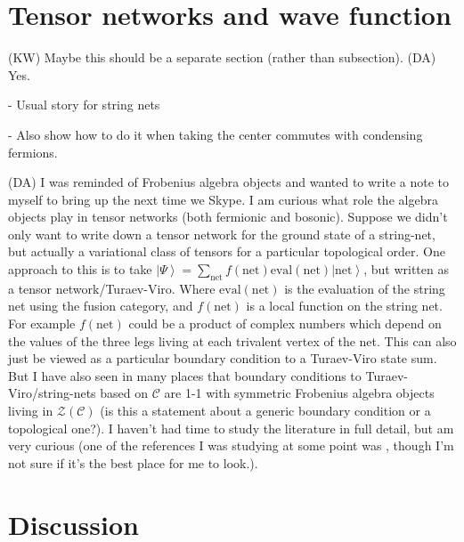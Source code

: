 \documentclass[12pt,a4paper]{article}
\newcommand{\mcz}{\mathcal{Z}}
\newcommand{\mcc}{\mathcal{C}}
\newcommand{\kw}[1]{{\color{kwcolor}\footnotesize{(KW) #1}}}
\newcommand{\ket}[1]{\ensuremath{\left|#1\right\rangle}}
\newcommand{\dave}[1]{{\color{ao(english)}\footnotesize{(DA) #1}}}
\begin{document}



\section{Tensor networks and wave function}
\kw{Maybe this should be a separate section (rather than subsection).}
\dave{Yes.}

- Usual story for string nets

- Also show how to do it when taking the center commutes with condensing fermions. 


\dave{
I was reminded of Frobenius algebra objects and wanted to write a note to myself to bring up the next time we Skype.
I am curious what role the algebra objects play in tensor networks (both fermionic and bosonic).
Suppose we didn't only want to write down a tensor network for the ground state of a string-net, 
but actually a variational class of tensors for a particular topological order.
One approach to this is to take $\ket{\Psi} = \sum_{\text{net}} f(\text{net}) \text{eval}(\text{net}) \ket{\text{net}}$, but written as a tensor network/Turaev-Viro. 
Where $\text{eval}(\text{net})$ is the evaluation of the string net using the fusion category, 
and $f(\text{net})$ is a local function on the string net.
For example $f(\text{net})$ could be a product of complex numbers which depend on the values of the three legs living at each trivalent vertex of the net. 
This can also just be viewed as a particular boundary condition to a Turaev-Viro state sum.
But I have also seen in many places that boundary conditions to Turaev-Viro/string-nets 
based on $\mcc$ are 1-1 with symmetric Frobenius algebra objects living in $\mcz(\mcc)$ (is this a statement about a generic boundary condition or a topological one?).
I haven't had time to study the literature in full detail, but am very curious 
(one of the references I was studying at some point was \cite{Schauenburg2001}, 
though I'm not sure if it's the best place for me to look.).
}

 
\section{Discussion} \label{discussion}
\end{document}
